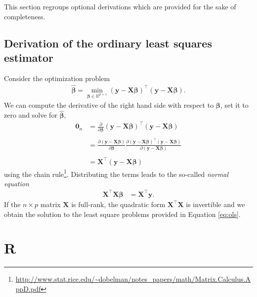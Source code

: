 \documentclass[
  11pt,
  letterpaper,
]{book}
\renewcommand{\href}[2]{#2\footnote{\url{#1}}}
\theoremstyle{definition}
\theoremstyle{definition}
\theoremstyle{definition}
\theoremstyle{remark}
\begin{document}
This section regroups optional derivations which are provided for the sake of completeness.

\hypertarget{ols}{%
\section{Derivation of the ordinary least squares estimator}\label{ols}}

Consider the optimization problem
\begin{align*}
\widehat{\boldsymbol{\beta}}=\min_{\boldsymbol{\beta} \in \mathbb{R}^{p+1}}(\boldsymbol{y}-\mathbf{X}\boldsymbol{\beta})^\top(\boldsymbol{y}-\mathbf{X}\boldsymbol{\beta}).
\end{align*}
We can compute the derivative of the right hand side with respect to \(\boldsymbol{\beta}\), set it to zero and solve for \(\widehat{\boldsymbol{\beta}}\),\\
\begin{align*}
\mathbf{0}_n&=\frac{\partial}{\partial\boldsymbol{\beta}}(\boldsymbol{y}-\mathbf{X}\boldsymbol{\beta})^\top(\boldsymbol{y}-\mathbf{X}\boldsymbol{\beta})\\
\\&=\frac{\partial (\boldsymbol{y}-\mathbf{X}\boldsymbol{\beta})}{\partial \boldsymbol{\beta}}\frac{\partial (\boldsymbol{y}-\mathbf{X}\boldsymbol{\beta})^\top(\boldsymbol{y}-\mathbf{X}\boldsymbol{\beta})}{\partial (\boldsymbol{y}-\mathbf{X}\boldsymbol{\beta})}\\
 \\&=\mathbf{X}^\top (\boldsymbol{y}-\mathbf{X}\boldsymbol{\beta})
\end{align*}
using the \href{http://www.stat.rice.edu/~dobelman/notes_papers/math/Matrix.Calculus.AppD.pdf}{chain rule}. Distributing the terms leads to the so-called \emph{normal equation}
\begin{align*}
 \mathbf{X}^\top \mathbf{X}\boldsymbol{\beta}&=\mathbf{X}^\top \boldsymbol{y}.
\end{align*}
If the \(n \times p\) matrix \(\mathbf{X}\) is full-rank, the quadratic form \(\mathbf{X}^\top \mathbf{X}\) is invertible and we obtain the solution to the least square problems provided in Equation \eqref{eq:ols}.

\hypertarget{appendix-appendix}{%
\appendix}


\hypertarget{r}{%
\chapter*{\texorpdfstring{\textbf{R}}{R}}\label{r}}
\end{document}
